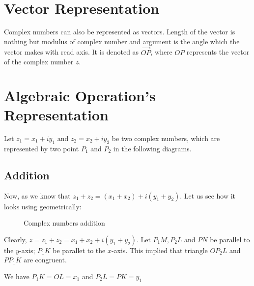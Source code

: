 \section{Vector Representation}
Complex numbers can also be represented as vectors. Length of the vector is nothing but modulus of complex number and argument is
the angle which the vector makes with read axis. It is denoted as $\overrightarrow{OP}$, where $OP$ represents the vector of the
complex number $z$.

\section{Algebraic Operation's Representation}
Let $z_1 = x_1 + iy_1$ and $z_2 = x_2 + iy_2$ be two complex numbers, which are represented by two point $P_1$ and $P_2$ in the
following diagrams.

\subsection{Addition}
Now, as we know that $z_1 + z_2 = (x_1 + x_2) + i(y_1 + y_2)$. Let us see how it looks using geometrically:
\begin{figure}[h]
  \begin{center}
    \caption{Complex numbers addition}
  \end{center}
\end{figure}
Clearly, $z = z_1 + z_2 = x_1 + x_2 + i(y_1 + y_2)$. Let $P_1M, P_2L$ and $PN$ be parallel to the $y$-axis; $P_1K$ be parallet to
the $x$-axis. This implied that triangle $OP_2L$ and $PP_1K$ are congruent.

We have $P_1K = OL = x_1$ and $P_2L = PK = y_1$

